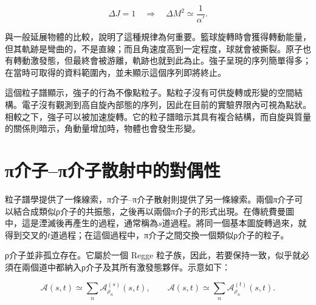 \begin{equation}
  \Delta J=1
  \quad\Longrightarrow\quad
  \Delta M^2\simeq \frac{1}{\alpha'}.
  \label{eq:l01-regge-spacing}
\end{equation}

\begin{classroomqa}
\end{classroomqa}

與一般延展物體的比較，說明了這種規律為何重要。籃球旋轉時會獲得轉動能量，但其軌跡是彎曲的，不是直線；而且角速度高到一定程度，球就會被撕裂。原子也有轉動激發態，但最終會被游離，軌跡也就到此為止。強子呈現的序列簡單得多；在當時可取得的資料範圍內，並未顯示這個序列即將終止。

這個粒子譜顯示，強子的行為不像點粒子。點粒子沒有可供旋轉或形變的空間結構。電子沒有觀測到高自旋內部態的序列，因此在目前的實驗界限內可視為點狀。相較之下，強子可以被加速旋轉。它的粒子譜暗示其具有複合結構，而自旋與質量的關係則暗示，角動量增加時，物體也會發生形變。

\section{{\proseunicodefont π}介子--{\proseunicodefont π}介子散射中的對偶性}

粒子譜學提供了一條線索，{\proseunicodefont π}介子--{\proseunicodefont π}介子散射則提供了另一條線索。兩個{\proseunicodefont π}介子可以結合成類似{\proseunicodefont ρ}介子的共振態，之後再以兩個{\proseunicodefont π}介子的形式出現。在傳統費曼圖中，這是湮滅後再產生的過程，通常稱為\(s\)道過程。將同一個基本圖旋轉過來，就得到交叉的\(t\)道過程；在這個過程中，{\proseunicodefont π}介子之間交換一個類似{\proseunicodefont ρ}介子的粒子。

{\proseunicodefont ρ}介子並非孤立存在。它屬於一個 Regge 粒子族，因此，若要保持一致，似乎就必須在兩個道中都納入{\proseunicodefont ρ}介子及其所有激發態夥伴。示意如下：

\begin{equation}
  \mathcal A(s,t)\simeq
  \sum_n \mathcal A^{(s)}_{\rho_n}(s,t),
  \qquad
  \mathcal A(s,t)\simeq
  \sum_n \mathcal A^{(t)}_{\rho_n}(s,t).
  \label{eq:l01-channel-sums}
\end{equation}

